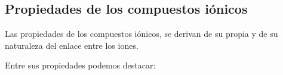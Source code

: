 %
%
%
%
%
%
%

\subsection{Propiedades de los compuestos iónicos}

Las propiedades de los compuestos iónicos, se derivan de su propia  y de su naturaleza  del enlace entre los iones.

Entre sus propiedades podemos destacar:

